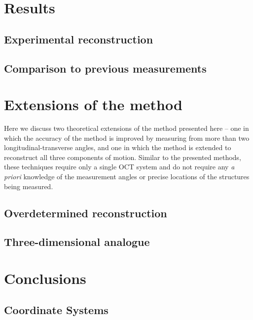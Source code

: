 \documentclass[preprint,NumberedRefs]{JASA}
\begin{document}
\section{Results}
\subsection{Experimental reconstruction}
\subsection{Comparison to previous measurements}

\section{Extensions of the method}
\par{Here we discuss two theoretical extensions of the method presented here -- one in which the accuracy of the method is improved by measuring from more than two longitudinal-transverse angles, and one in which the method is extended to reconstruct all three components of motion. Similar to the presented methods, these techniques require only a single OCT system and do not require any \textit{a priori} knowledge of the measurement angles or precise locations of the structures being measured.}
\subsection{Overdetermined reconstruction}
\subsection{Three-dimensional analogue}

\section{Conclusions}

\subsection{Coordinate Systems}
\end{document}
